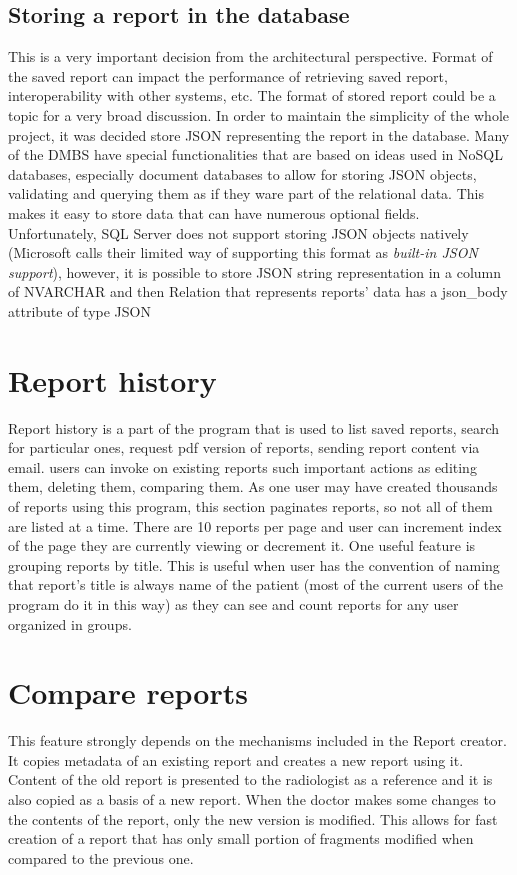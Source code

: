 \documentclass[12pt, twoside, openany]{report}
\theoremstyle{definition}
\begin{document}
\subsection{Storing a report in the database}
This is a very important decision from the architectural perspective. Format of the saved report can impact the performance of retrieving saved report, interoperability with other systems, etc. The format of stored report could be a topic for a very broad discussion. In order to maintain the simplicity of the whole project, it was decided store JSON representing the report in the database. Many of the DMBS have special functionalities that are based on ideas used in NoSQL databases, especially document databases to allow for storing JSON objects, validating and querying them as if they ware part of the relational data. This makes it easy to store data that can have numerous optional fields. Unfortunately, SQL Server does not support storing JSON objects natively (Microsoft calls their limited way of supporting this format as \textit{built-in JSON support}\cite{microsoft-json-support}), however, it is possible to store JSON string representation in a column of NVARCHAR and then
Relation that represents reports' data has a json\_body attribute of type JSON
\section{Report history}
Report history is a part of the program that is used to list saved reports, search for particular ones, request pdf version of reports, sending report content via email. users can invoke on existing reports such important actions as editing them, deleting them, comparing them. As one user may have created thousands of reports using this program, this section paginates reports, so not all of them are listed at a time. There are 10 reports per page and user can increment index of the page they are currently viewing or decrement it. 
One useful feature is grouping reports by title. This is useful when user has the convention of naming that report's title is always name of the patient (most of the current users of the program do it in this way) as they can see and count reports for any user organized in groups. 

\section{Compare reports}
This feature strongly depends on the mechanisms included in the Report creator. It copies metadata of an existing report and creates a new report using it. Content of the old report is presented to the radiologist as a reference and it is also copied as a basis of a new report. When the doctor makes some changes to the contents of the report, only the new version is modified. This allows for fast creation of a report that has only small portion of fragments modified when compared to the previous one.
\end{document}
